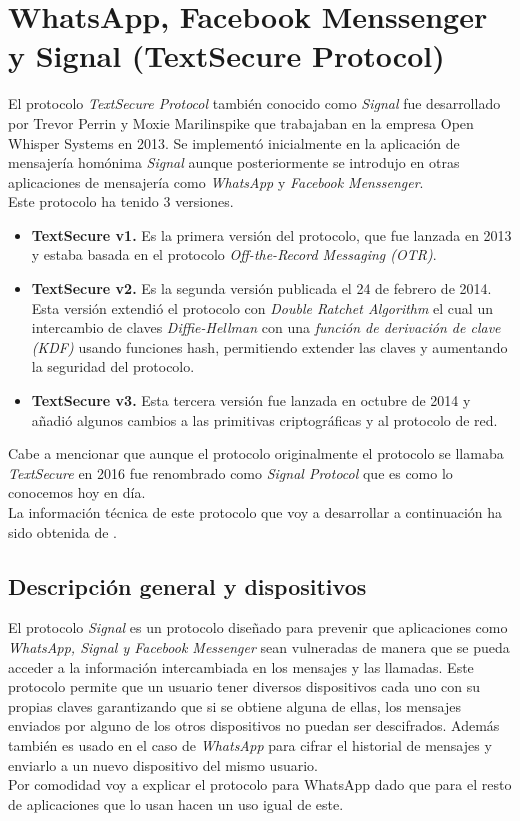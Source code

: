 \section{WhatsApp, Facebook Menssenger y Signal (TextSecure Protocol)}
El protocolo \emph{TextSecure Protocol} también conocido como \emph{Signal} fue desarrollado por Trevor Perrin y Moxie Marilinspike que trabajaban en la empresa Open Whisper Systems en 2013. Se implementó inicialmente en la aplicación de mensajería homónima \emph{Signal} aunque posteriormente se introdujo en otras aplicaciones de mensajería como \emph{WhatsApp} y \emph{Facebook Menssenger}.\\
Este protocolo ha tenido 3 versiones.
\begin{itemize}
	\item \textbf{TextSecure v1.} Es la primera versión del protocolo, que fue lanzada en 2013 y estaba basada en el protocolo \emph{Off-the-Record Messaging (OTR)}.
	\item \textbf{TextSecure v2.} Es la segunda versión publicada el 24 de febrero de 2014. Esta versión extendió el protocolo con \emph{Double Ratchet Algorithm} el cual un intercambio de claves \emph{Diffie-Hellman} con una \emph{función de derivación de clave (KDF)} usando funciones hash, permitiendo extender las claves y aumentando la seguridad del protocolo.
	\item \textbf{TextSecure v3.} Esta tercera versión fue lanzada en octubre de 2014 y añadió algunos cambios a las primitivas criptográficas y al protocolo de red.
\end{itemize}
Cabe a mencionar que aunque el protocolo originalmente el protocolo se llamaba \emph{TextSecure} en 2016 fue renombrado como \emph{Signal Protocol} que es como lo conocemos hoy en día.\\
La información técnica de este protocolo que voy a desarrollar a continuación ha sido obtenida de \cite{November2021b}.

\subsection{Descripción general y dispositivos}
El protocolo \emph{Signal} es un protocolo diseñado para prevenir que aplicaciones como \emph{WhatsApp, Signal y Facebook Messenger} sean vulneradas de manera que se pueda acceder a la información intercambiada en los mensajes y las llamadas. Este protocolo permite que un usuario tener diversos dispositivos cada uno con su propias claves garantizando que si se obtiene alguna de ellas, los mensajes enviados por alguno de los otros dispositivos no puedan ser descifrados. Además también es usado en el caso de \emph{WhatsApp} para cifrar el historial de mensajes y enviarlo a un nuevo dispositivo del mismo usuario.\\
Por comodidad voy a explicar el protocolo para WhatsApp dado que para el resto de aplicaciones que lo usan hacen un uso igual de este.\\

